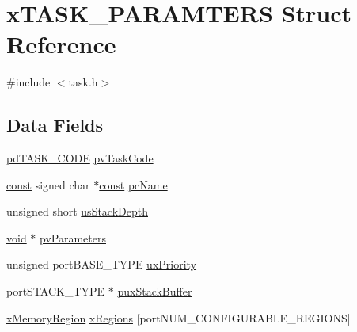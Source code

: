 \hypertarget{structx_t_a_s_k___p_a_r_a_m_t_e_r_s}{\section{x\-T\-A\-S\-K\-\_\-\-P\-A\-R\-A\-M\-T\-E\-R\-S Struct Reference}
\label{structx_t_a_s_k___p_a_r_a_m_t_e_r_s}
}


{\ttfamily \#include $<$task.\-h$>$}

\subsection*{Data Fields}
\begin{DoxyCompactItemize}
\item 
\hyperlink{win32_2win32_2_libraries_2_free_r_t_o_s_2_source_2include_2projdefs_8h_ae74d12a2f9cb1fcae89532830b5413ac}{pd\-T\-A\-S\-K\-\_\-\-C\-O\-D\-E} \hyperlink{structx_t_a_s_k___p_a_r_a_m_t_e_r_s_a6cf96a364e0960bde2091fc333db4fe8}{pv\-Task\-Code}
\item 
\hyperlink{group___n_a_m_e_ga7ae6d0e43244213b34de2c2b9aa30da6}{const} signed char $\ast$\hyperlink{group___n_a_m_e_ga7ae6d0e43244213b34de2c2b9aa30da6}{const} \hyperlink{structx_t_a_s_k___p_a_r_a_m_t_e_r_s_a337b9cddfe303eda4b5f0316816b5241}{pc\-Name}
\item 
unsigned short \hyperlink{structx_t_a_s_k___p_a_r_a_m_t_e_r_s_a78a22fdc211362ec426d12678c6f538f}{us\-Stack\-Depth}
\item 
\hyperlink{group___n_a_m_e_ga18028b8badbf1ea7e704ccac3c488e82}{void} $\ast$ \hyperlink{structx_t_a_s_k___p_a_r_a_m_t_e_r_s_ac46c7bb4576e3f4d6ff50d6616233509}{pv\-Parameters}
\item 
unsigned port\-B\-A\-S\-E\-\_\-\-T\-Y\-P\-E \hyperlink{structx_t_a_s_k___p_a_r_a_m_t_e_r_s_a986b666d0e341b98f5924c3531e43fc3}{ux\-Priority}
\item 
port\-S\-T\-A\-C\-K\-\_\-\-T\-Y\-P\-E $\ast$ \hyperlink{structx_t_a_s_k___p_a_r_a_m_t_e_r_s_a5cc7bcc51c9c46464d9a322e8acdd2c7}{pux\-Stack\-Buffer}
\item 
\hyperlink{_common_2_libraries_2_free_r_t_o_s_2_source_2include_2task_8h_a0327ca449bbeb07a6f76456943c787dc}{x\-Memory\-Region} \hyperlink{structx_t_a_s_k___p_a_r_a_m_t_e_r_s_ad3abcb257fabbc2ef6444c263a84d766}{x\-Regions} \mbox{[}port\-N\-U\-M\-\_\-\-C\-O\-N\-F\-I\-G\-U\-R\-A\-B\-L\-E\-\_\-\-R\-E\-G\-I\-O\-N\-S\mbox{]}
\end{DoxyCompactItemize}


